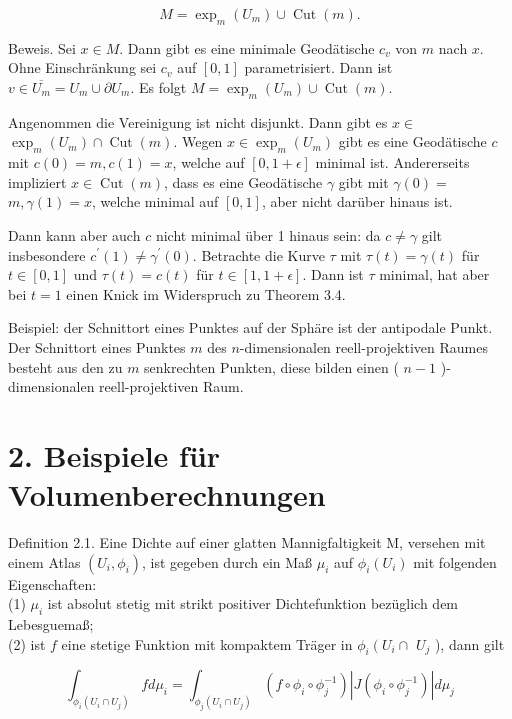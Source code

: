 \documentclass[10pt]{article}
\begin{document}
$$
M=\exp _{m}\left(U_{m}\right) \cup \operatorname{Cut}(m) .
$$

Beweis. Sei $x \in M$. Dann gibt es eine minimale Geodätische $c_{v}$ von $m$ nach $x$. Ohne Einschränkung sei $c_{v}$ auf $[0,1]$ parametrisiert. Dann ist $v \in \overline{U_{m}}=U_{m} \cup \partial U_{m}$. Es folgt $M=\exp _{m}\left(U_{m}\right) \cup \operatorname{Cut}(m)$.

Angenommen die Vereinigung ist nicht disjunkt. Dann gibt es $x \in$ $\exp _{m}\left(U_{m}\right) \cap \operatorname{Cut}(m)$. Wegen $x \in \exp _{m}\left(U_{m}\right)$ gibt es eine Geodätische $c$ mit $c(0)=m, c(1)=x$, welche auf $[0,1+\epsilon]$ minimal ist. Andererseits impliziert $x \in \operatorname{Cut}(m)$, dass es eine Geodätische $\gamma$ gibt mit $\gamma(0)=$ $m, \gamma(1)=x$, welche minimal auf $[0,1]$, aber nicht darüber hinaus ist.

Dann kann aber auch $c$ nicht minimal über 1 hinaus sein: da $c \neq \gamma$ gilt insbesondere $c^{\prime}(1) \neq \gamma^{\prime}(0)$. Betrachte die Kurve $\tau$ mit $\tau(t)=\gamma(t)$ für $t \in[0,1]$ und $\tau(t)=c(t)$ für $t \in[1,1+\epsilon]$. Dann ist $\tau$ minimal, hat aber bei $t=1$ einen Knick im Widerspruch zu Theorem 3.4.

Beispiel: der Schnittort eines Punktes auf der Sphäre ist der antipodale Punkt. Der Schnittort eines Punktes $m$ des $n$-dimensionalen reell-projektiven Raumes besteht aus den zu $m$ senkrechten Punkten, diese bilden einen ( $n-1$ )-dimensionalen reell-projektiven Raum.

\section*{2. Beispiele für Volumenberechnungen}
Definition 2.1. Eine Dichte auf einer glatten Mannigfaltigkeit M, versehen mit einem Atlas $\left(U_{i}, \phi_{i}\right)$, ist gegeben durch ein Maß $\mu_{i}$ auf $\phi_{i}\left(U_{i}\right)$ mit folgenden Eigenschaften:\\
(1) $\mu_{i}$ ist absolut stetig mit strikt positiver Dichtefunktion bezüglich dem Lebesguemaß;\\
(2) ist $f$ eine stetige Funktion mit kompaktem Träger in $\phi_{i}\left(U_{i} \cap\right.$ $U_{j}$ ), dann gilt

$$
\int_{\phi_{i}\left(U_{i} \cap U_{j}\right)} f d \mu_{i}=\int_{\phi_{j}\left(U_{i} \cap U_{j}\right)}\left(f \circ \phi_{i} \circ \phi_{j}^{-1}\right)\left|J\left(\phi_{i} \circ \phi_{j}^{-1}\right)\right| d \mu_{j}
$$
\end{document}

